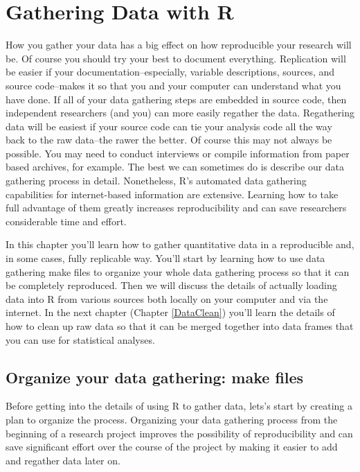 



\chapter{Gathering Data with R}\label{DataGather}

How you gather your data has a big effect on how reproducible your research will be. Of course you should try your best to document everything. Replication will be easier if your documentation--especially, variable descriptions, sources, and source code--makes it so that you and your computer can understand what you have done. If all of your data gathering steps are embedded in source code, then independent researchers (and you) can more easily regather the data. Regathering data will be easiest if your source code can tie your analysis code all the way back to the raw data--the rawer the better. Of course this may not always be possible. You may need to conduct interviews or compile information from paper based archives, for example. The best we can sometimes do is describe our data gathering process in detail. Nonetheless, R's automated data gathering capabilities for internet-based information are extensive. Learning how to take full advantage of them greatly increases reproducibility and can save researchers considerable time and effort.

In this chapter you'll learn how to gather quantitative data in a reproducible and, in some cases, fully replicable way. You'll start by learning how to use data gathering make files to organize your whole data gathering process so that it can be completely reproduced. Then we will discuss the details of actually loading data into R from various sources both locally on your computer and via the internet. In the next chapter (Chapter \ref{DataClean}) you'll learn the details of how to clean up raw data so that it can be merged together into data frames that you can use for statistical analyses.

\section{Organize your data gathering: make files}

Before getting into the details of using R to gather data, lets's start by creating a plan to organize the process. Organizing your data gathering process from the beginning of a research project improves the possibility of reproducibility and can save significant effort over the course of the project by making it easier to add and regather data later on. 

